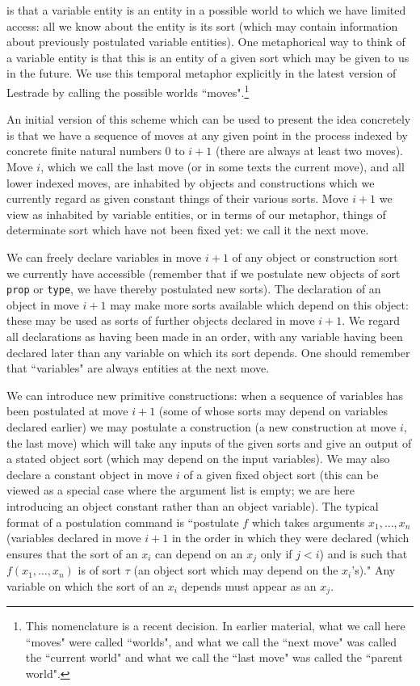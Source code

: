 \documentclass[12pt]{article}
\begin{document}
is that a variable entity is an entity in a possible world to which we have limited access:  all we know about the entity is its sort (which may contain information about previously postulated variable entities).  One metaphorical way to think of a variable entity  is that this is an entity of a given sort which may be given to us in the future.  We use this temporal metaphor explicitly in the latest version of Lestrade by calling the possible worlds ``moves".\footnote{This nomenclature is a recent decision.  In earlier material, what we call here ``moves"  were called ``worlds",
and what we call the ``next move" was called the ``current world" and what we call the ``last move" was called the ``parent world".}

 
An initial version of this scheme which can be used to present the idea concretely is that we have a sequence of moves at any given point in the process indexed by concrete finite natural numbers 0 to $i+1$ (there are always at least two moves).  Move $i$, which we call the last move (or in some texts the current move), and all lower indexed moves, are inhabited by objects and constructions which we currently regard as given constant things of their various sorts.  Move $i+1$ we view as inhabited by variable entities, or in terms of our metaphor, things of determinate sort which have not been fixed yet:  we call it the next move.

We can freely declare variables in move $i+1$ of any object or construction sort we currently have accessible (remember that if we postulate new objects of sort {\tt prop} or {\tt type}, we have thereby postulated new sorts).  The declaration of an object in move $i+1$ may make more sorts available which depend on this object:  these may be used as sorts of further
objects declared in move $i+1$.  We regard all declarations as having been made in an order, with any variable having been declared later than any variable on which its sort depends.
One should remember that ``variables" are always entities at the next move.

We can introduce new primitive constructions:  when a sequence of variables has been postulated at move $i+1$ (some of whose sorts may depend on variables declared earlier)
we may postulate a construction (a new construction at move $i$, the last move) which will take any inputs of the given sorts and give an output of a stated object sort
(which may depend on the input variables).  We may also declare a constant object in move $i$ of a given fixed object sort (this can be viewed as a special case where the argument list is empty; we are here introducing an object constant rather than an object variable).   The typical format of a postulation command is ``postulate $f$ which takes arguments $x_1,\ldots,x_n$ (variables declared in move $i+1$ in the order in which they were declared (which ensures that the sort of an $x_i$ can depend on an $x_j$ only if $j<i$) and is such that $f(x_1,\ldots,x_n)$ is of sort $\tau$ (an object sort which may depend on the $x_i$'s)."  Any variable on which the sort of an $x_i$ depends must appear as an $x_j$.
\end{document}
